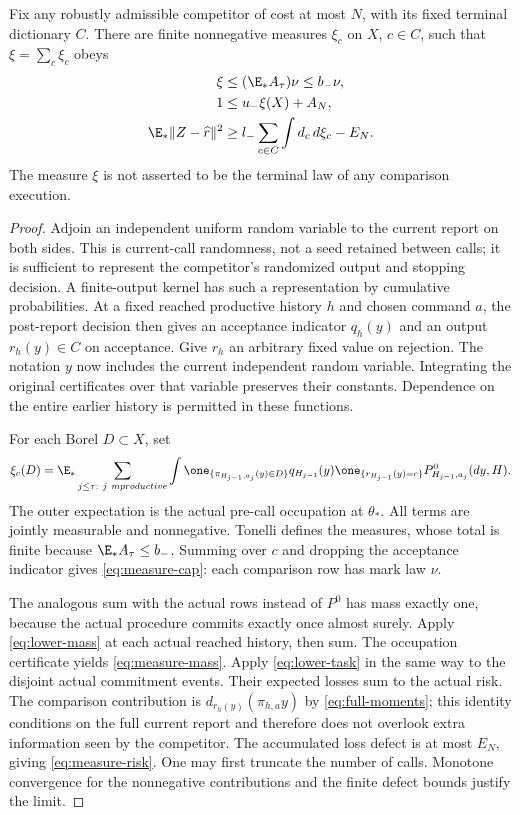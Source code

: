 \begin{lemma}\label{lem:comparison}
Fix any robustly admissible competitor of cost at most $N$, with its fixed terminal dictionary $C$. There are finite nonnegative measures $\xi_c$ on $X$, $c\in C$, such that $\xi=\sum_c\xi_c$ obeys
\begin{align}
 \xi&\le (\E_*A_\tau)\nu\le b_-\nu,\label{eq:measure-cap}\\
 1&\le u_-\xi(X)+A_N,\label{eq:measure-mass}\\
 \E_*\|Z-\widehat r\|^2
 &\ge l_-\sum_{c\in C}\int d_c\,d\xi_c-E_N.
 \label{eq:measure-risk}
\end{align}
The measure $\xi$ is not asserted to be the terminal law of any comparison execution.
\end{lemma}
\begin{proof}
Adjoin an independent uniform random variable to the current report on both sides. This is current-call randomness, not a seed retained between calls; it is sufficient to represent the competitor's randomized output and stopping decision. A finite-output kernel has such a representation by cumulative probabilities. At a fixed reached productive history $h$ and chosen command $a$, the post-report decision then gives an acceptance indicator $q_h(y)$ and an output $r_h(y)\in C$ on acceptance. Give $r_h$ an arbitrary fixed value on rejection. The notation $y$ now includes the current independent random variable. Integrating the original certificates over that variable preserves their constants. Dependence on the entire earlier history is permitted in these functions.

For each Borel $D\subset X$, set
\begin{equation}\label{eq:xi-definition}
 \xi_c(D)=\E_*\sum_{j\le\tau:\ j\ {
m productive}}
 \int\one_{\{\pi_{H_{j-1},a_j}(y)\in D\}}
 q_{H_{j-1}}(y)\one_{\{r_{H_{j-1}}(y)=c\}}
 P^0_{H_{j-1},a_j}(dy,H).
\end{equation}
The outer expectation is the actual pre-call occupation at $\theta_*$. All terms are jointly measurable and nonnegative. Tonelli defines the measures, whose total is finite because $\E_*A_\tau\le b_-$. Summing over $c$ and dropping the acceptance indicator gives \eqref{eq:measure-cap}: each comparison row has mark law $\nu$.

The analogous sum with the actual rows instead of $P^0$ has mass exactly one, because the actual procedure commits exactly once almost surely. Apply \eqref{eq:lower-mass} at each actual reached history, then sum. The occupation certificate yields \eqref{eq:measure-mass}. Apply \eqref{eq:lower-task} in the same way to the disjoint actual commitment events. Their expected losses sum to the actual risk. The comparison contribution is $d_{r_h(y)}(\pi_{h,a}y)$ by \eqref{eq:full-moments}; this identity conditions on the full current report and therefore does not overlook extra information seen by the competitor. The accumulated loss defect is at most $E_N$, giving \eqref{eq:measure-risk}. One may first truncate the number of calls. Monotone convergence for the nonnegative contributions and the finite defect bounds justify the limit.


\end{proof}
